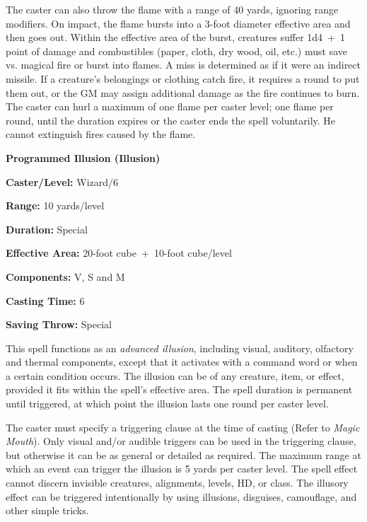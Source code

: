 \begin{multicols}{2}
The caster can also throw the flame with a range of 40 yards, ignoring range modifiers.  On impact, the flame bursts into a 3-foot diameter effective area and then goes out.  Within the effective area of the burst, creatures suffer 1d4~+~1 point of damage and combustibles (paper, cloth, dry wood, oil, etc.) must save vs. magical fire or burst into flames.  A miss is determined as if it were an indirect missile.  If a creature's belongings or clothing catch fire, it requires a round to put them out, or the GM may assign additional damage as the fire continues to burn.  The caster can hurl a maximum of one flame per caster level; one flame per round, until the duration expires or the caster ends the spell voluntarily.  He cannot extinguish fires caused by the flame.

\vspace{1em}

\noindent
\begin{minipage}{\columnwidth}

\noindent \textbf{Programmed Illusion (Illusion)}

\noindent \textbf{Caster/Level:} Wizard/6

\noindent \textbf{Range:} 10 yards/level

\noindent \textbf{Duration:} Special

\noindent \textbf{Effective Area:} 20-foot cube~+~10-foot cube/level

\noindent \textbf{Components:} V, S and M

\noindent \textbf{Casting Time:} 6

\noindent \textbf{Saving Throw:} Special

\end{minipage}

This spell functions as an \textit{advanced illusion}, including visual, auditory, olfactory and thermal components, except that it activates with a command word or when a certain condition occurs.  The illusion can be of any creature, item, or effect, provided it fits within the spell's effective area.  The spell duration is permanent until triggered, at which point the illusion lasts one round per caster level.  

The caster must specify a triggering clause at the time of casting (Refer to \textit{Magic Mouth}).  Only visual and/or audible triggers can be used in the triggering clause, but otherwise it can be as general or detailed as required.  The maximum range at which an event can trigger the illusion is 5 yards per caster level.  The spell effect cannot discern invisible creatures, alignments, levels, HD, or class.  The illusory effect can be triggered intentionally by using illusions, disguises, camouflage, and other simple tricks.


\end{multicols}

